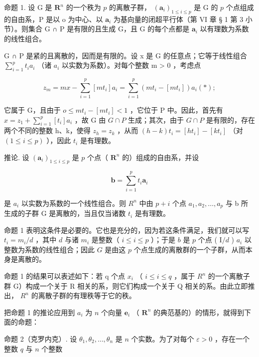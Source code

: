 命题 1. 设 G 是 \(\mathbf{R}^n\) 的一个秩为 \(p\) 的离散子群， \((\boldsymbol{a}_i)_{1 \leqslant i \leqslant p}\) 是 G 的 \(p\) 个点组成的自由系，P 是以 o 为中心、以 \(\boldsymbol{a}_i\) 为基向量的闭超平行体（第 VI 章 § 1 第 3 小节）。则集合 G ∩ P 是有限的且生成 G，且 G 的每个点都是 \(\boldsymbol{a}_i\) 以有理数为系数的线性组合。

G ∩ P 是紧的且离散的，因而是有限的。设 x 是 G 的任意点；它等于线性组合 \(\sum_{i=1}^{p} t_{i}a_{i}\) （诸 \(a_{i}\) 以实数为系数）。对每个整数 m \textgreater{} 0 ，考虑点

\[
z _ {m} = m x - \sum_ {i = 1} ^ {p} [ m t _ {i} ] a _ {i} = \sum_ {i = 1} ^ {p} (m t _ {i} - [ m t _ {i} ]) a _ {i} (*);
\]

它属于 G，且由于 \(o \leqslant mt_{i} - [mt_{i}] < 1\) ，它位于 P 中。因此，首先有 \(x = z_{1} + \sum_{i=1}^{p} [t_{i}] a_{i}\) ，故 G 由 \(G \cap P\) 生成；其次，由于 \(G \cap P\) 是有限的，存在两个不同的整数 h、k，使得 \(z_{h} = z_{k}\) ，从而 \((h - k)t_{i} = [ht_{i}] - [kt_{i}]\) （对 \((1 \leqslant i \leqslant p)\) ），因此 \(t_{i}\) 是有理数。

推论. 设 \((\pmb{a}_i)_{1\leqslant i\leqslant p}\) 是 \(p\) 个点（ \(\mathbf{R}^n\) 的）组成的自由系，并设

\[
\boldsymbol {b} = \sum_ {i = 1} ^ {p} t _ {i} \boldsymbol {a} _ {i}
\]

是 \(a_{i}\) 以实数为系数的一个线性组合。则 \(R^{n}\) 中由 \(p + i\) 个点 \(a_{1}, a_{2}, \ldots, a_{p}\) 与 b 所生成的子群 G 是离散的，当且仅当诸数 \(t_{i}\) 是有理数。

命题 1 表明这条件是必要的。它也是充分的，因为若这条件满足，我们就可以写 \(t_i = m_i / d\) ，其中 \(d\) 与诸 \(m_i\) 是整数（ \(i \leqslant i \leqslant p\) ）；于是 \(b\) 是 \(p\) 个点 ( \(\mathrm{I} / d\) ) \(a_i\) 以整数为系数的线性组合；因此 \(G\) 是由这 \(p\) 个点生成的离散群的一个子群，从而本身是离散的。

命题 1 的结果可以表述如下：若 q 个点 \(x_{i}\) （ \(i \leqslant i \leqslant q\) ，属于 \(R^{n}\) 的一个离散子群 G）构成一个关于 R 相关的系，则它们构成一个关于 Q 相关的系。由此立即推出， \(R^{n}\) 的离散子群的有理秩等于它的秩。

把命题 1 的推论应用到 \(a_{i}\) 为 \(n\) 个向量 \(\pmb{e}_{i}\) （ \(\mathbf{R}^{n}\) 的典范基的）的情形，就得到下面的命题：

命题 2（克罗内克）. 设 \(\theta_{1}, \theta_{2}, \ldots, \theta_{n}\) 是 \(n\) 个实数。为了对每个 \(\varepsilon > 0\) ，存在一个整数 \(q\) 与 \(n\) 个整数

